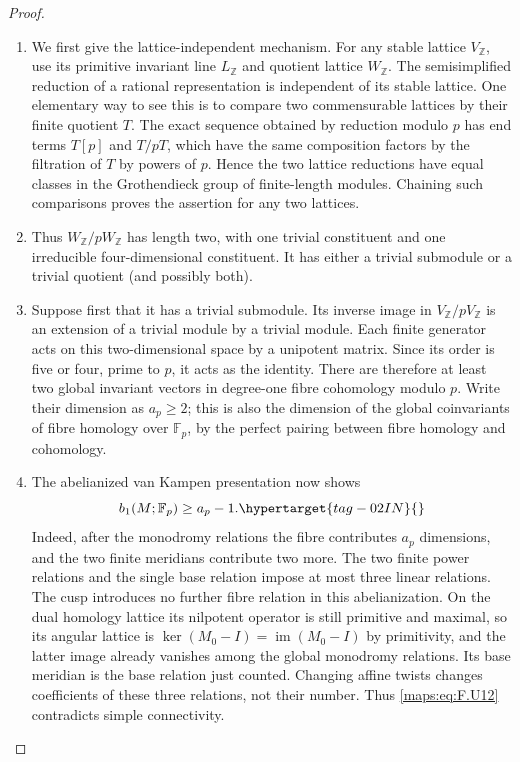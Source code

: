 \documentclass[11pt,a4paper]{article}
\numberwithin{equation}{section}
\theoremstyle{definition}
\begin{document}
\begin{proof}
\begin{enumerate}[label=\arabic*.]
\item We first give the lattice-independent mechanism.  For any
stable lattice $V_\mathbb Z$, use its primitive invariant
line $L_\mathbb Z$ and quotient lattice $W_\mathbb Z$.
The semisimplified reduction of a rational representation is
independent of its stable lattice.  One elementary way to see
this is to compare two commensurable lattices by their finite
quotient $T$.  The exact sequence obtained by reduction modulo
$p$ has end terms $T[p]$ and $T/pT$, which have the same
composition factors by the filtration of $T$ by powers of $p$.
Hence the two lattice reductions have equal classes in the
Grothendieck group of finite-length modules.  Chaining such
comparisons proves the assertion for any two lattices.

\item Thus $W_\mathbb Z/pW_\mathbb Z$ has length two, with one
trivial constituent and one irreducible four-dimensional
constituent.  It has either a trivial submodule or a trivial
quotient (and possibly both).

\item Suppose first that it has a trivial submodule.  Its inverse
image in $V_\mathbb Z/pV_\mathbb Z$ is an extension of a
trivial module by a trivial module.  Each finite generator
acts on this two-dimensional space by a unipotent matrix.
Since its order is five or four, prime to $p$, it acts as
the identity.  There are therefore at least two global
invariant vectors in degree-one fibre cohomology modulo $p$.
Write their dimension as $a_p\ge2$; this is also the
dimension of the global coinvariants of fibre homology over
$\mathbb F_p$, by the perfect pairing between fibre homology
and cohomology.

\item The abelianized van Kampen presentation now shows
\begin{equation}
 b_1(M;\mathbb F_p)\ge a_p-1.
 \hypertarget{tag-02IN}{}\label{maps:eq:F.U12}
\end{equation}
Indeed, after the monodromy relations the fibre contributes
$a_p$ dimensions, and the two finite meridians contribute
two more.  The two finite power relations and the single
base relation impose at most three linear relations.
The cusp introduces no further fibre relation in this
abelianization.  On the dual homology lattice its nilpotent
operator is still primitive and maximal, so its angular lattice is
$\ker(M_0-I)=\operatorname{im}(M_0-I)$ by primitivity, and
the latter image already vanishes among the global
monodromy relations.  Its base meridian is the base relation
just counted.  Changing affine twists changes coefficients
of these three relations, not their number.  Thus \eqref{maps:eq:F.U12}
contradicts simple connectivity.


\end{enumerate}
\end{proof}
\end{document}
